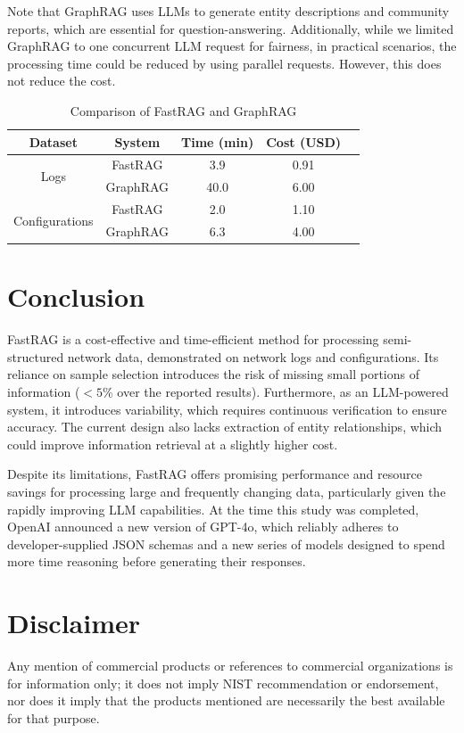 \documentclass[conference]{IEEEtran}
\begin{document}
Note that GraphRAG uses LLMs to generate entity descriptions and community reports, which are essential for question-answering.
Additionally, while we limited GraphRAG to one concurrent LLM request for fairness, in practical scenarios, the processing time could be reduced by using parallel requests. However, this does not reduce the cost.

\begin{table}[h!]
\centering
\caption{Comparison of FastRAG and GraphRAG}
\begin{tabular}{|c|c|c|c|c|}
\hline
\textbf{Dataset} & \textbf{System} & \textbf{Time (min)} & \textbf{Cost (USD)} \\ \hline
\multirow{2}{*}{Logs} & FastRAG & 3.9 & 0.91 \\ \cline{2-4} 
                           & GraphRAG & 40.0  & 6.00 \\ \hline
\multirow{2}{*}{Configurations} & FastRAG & 2.0 & 1.10 \\ \cline{2-4} 
                           & GraphRAG & 6.3 & 4.00 \\ \hline
\end{tabular}
\label{tab:improvement}
\end{table}

\section{Conclusion}\label{conclusion}
FastRAG is a cost-effective and time-efficient method for processing semi-structured network data, demonstrated on network logs and configurations. Its reliance on sample selection introduces the risk of missing small portions of information ($< 5\%$ over the reported results). Furthermore, as an LLM-powered system, it introduces variability, which requires continuous verification to ensure accuracy. The current design also lacks extraction of entity relationships, which could improve information retrieval at a slightly higher cost. 

Despite its limitations, FastRAG offers promising performance and resource savings for processing large and frequently changing data, particularly given the rapidly improving LLM capabilities. At the time this study was completed, OpenAI announced a new version of GPT-4o, which reliably adheres to developer-supplied JSON schemas and a new series of models designed to spend more time reasoning before generating their responses.

\section*{Disclaimer}
Any mention of commercial products or references to commercial organizations is for information only; it does not imply NIST recommendation or endorsement, nor does it imply that the products mentioned are necessarily the best available for that purpose.




\end{document}
